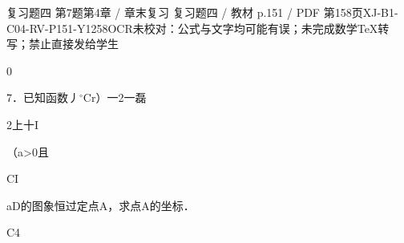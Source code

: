 \begin{bankitem}{复习题四 第7题}{第4章 / 章末复习 复习题四 / 教材 p.151 / PDF 第158页}{XJ-B1-C04-RV-P151-Y1258}{OCR未校对：公式与文字均可能有误；未完成数学TeX转写；禁止直接发给学生}
\begin{ocrdraft}
\par
0
\par
7．已知函数丿\ensuremath{{}^\circ\mathrm C}r）一2一磊
\par
2上十I
\par
（a>0且
\par
CI
\par
aD的图象恒过定点A，求点A的坐标．
\par
C4
\end{ocrdraft}
\end{bankitem}
